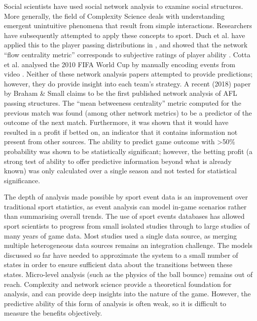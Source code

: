 Social scientists have used social network analysis to examine social
structures. More generally, the field of Complexity Science deals with
understanding emergent unintuitive phenomena that result from simple
interactions. Researchers have subsequently attempted to apply these
concepts to sport. Duch et al. have applied this to the player passing
distributions in \soccer{}, and showed that the network
``flow centrality metric'' corresponds to subjective ratings of player
ability \cite{Duch2010}. Cotta et al. analysed the 2010
FIFA World Cup by manually encoding events from video
\cite{Cotta2013}. Neither of these network analysis papers attempted to provide predictions; however, they do provide insight into each team's strategy. A recent (2018) paper by Braham \& Small \cite{Braham2018} claims to be the first published network analysis of AFL passing structures. The ``mean betweeness centrality'' metric computed for the previous match was found (among other network metrics) to be a predictor of the outcome of the next match. Furthermore, it was shown that it would have resulted in a profit if betted on, an indicator that it contains information not present from other sources. The ability to predict game outcome with >50\% probability was shown to be statistically significant; however, the betting profit (a strong test of ability to offer predictive information beyond what is already known) was only calculated over a single season and not tested for statistical significance.

The depth of analysis made possible by sport event data is an improvement over
traditional sport statistics, as event analysis can model in-game
scenarios rather than summarising overall trends. The use of sport events databases has allowed sport scientists to progress from small
isolated studies through to large studies of many years of game data.
Most studies used a single data source, as merging multiple
heterogeneous data sources remains an integration challenge. The models
discussed so far have needed to approximate the system to a small number
of states in order to ensure sufficient data about the transitions
between these states. Micro-level analysis (such as the physics of the
ball bounce) remains out of reach. Complexity and network science provide a
theoretical foundation for analysis, and can provide deep insights into
the nature of the game. However, the predictive ability of this form of analysis is often weak, so it
is difficult to measure the benefits objectively.


